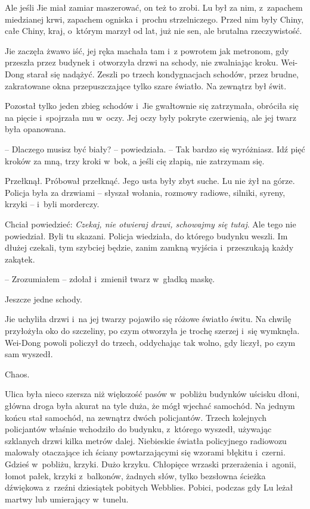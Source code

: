 \documentclass[oneside,polish,11pt,rmheadings]{mwbk}
\begin{document}
Ale jeśli Jie miał zamiar maszerować, on też to zrobi. Lu był za nim, z~zapachem miedzianej krwi, zapachem ogniska i~prochu strzelniczego. Przed nim były Chiny, całe Chiny, kraj, o~którym marzył od lat, już nie sen, ale brutalna rzeczywistość.

Jie zaczęła żwawo iść, jej ręka machała tam i~z powrotem jak metronom, gdy przeszła przez budynek i~otworzyła drzwi na schody, nie zwalniając kroku. Wei-Dong starał się nadążyć. Zeszli po trzech kondygnacjach schodów, przez brudne, zakratowane okna przepuszczające tylko szare światło. Na zewnątrz był świt.

Pozostał tylko jeden zbieg schodów i~Jie gwałtownie się zatrzymała, obróciła się na pięcie i~spojrzała mu w~oczy. Jej oczy były pokryte czerwienią, ale jej twarz była opanowana. 

-- Dlaczego musisz być biały? -- powiedziała. -- Tak bardzo się wyróżniasz. Idź pięć kroków za mną, trzy kroki w~bok, a jeśli cię złapią, nie zatrzymam się.

Przełknął. Próbował przełknąć. Jego usta były zbyt suche. Lu nie żył na górze. Policja była za drzwiami -- słyszał wołania, rozmowy radiowe, silniki, syreny, krzyki -- i~byli morderczy.

Chciał powiedzieć: \textit{Czekaj, nie otwieraj drzwi, schowajmy się tutaj}. Ale tego nie powiedział. Byli tu skazani. Policja wiedziała, do którego budynku weszli. Im dłużej czekali, tym szybciej będzie, zanim zamkną wyjścia i~przeszukają każdy zakątek.

-- Zrozumiałem -- zdołał i~zmienił twarz w~gładką maskę.

Jeszcze jedne schody.

Jie uchyliła drzwi i~na jej twarzy pojawiło się różowe światło świtu. Na chwilę przyłożyła oko do szczeliny, po czym otworzyła je trochę szerzej i~się wymknęła. Wei-Dong powoli policzył do trzech, oddychając tak wolno, gdy liczył, po czym sam wyszedł.

Chaos. 

Ulica była nieco szersza niż większość pasów w~pobliżu budynków uścisku dłoni, główna droga była akurat na tyle duża, że mógł wjechać samochód. Na jednym końcu stał samochód, na zewnątrz dwóch policjantów. Trzech kolejnych policjantów właśnie wchodziło do budynku, z~którego wyszedł, używając szklanych drzwi kilka metrów dalej. Niebieskie światła policyjnego radiowozu malowały otaczające ich ściany powtarzającymi się wzorami błękitu i~czerni. Gdzieś w~pobliżu, krzyki. Dużo krzyku. Chłopięce wrzaski przerażenia i~agonii, łomot pałek, krzyki z~balkonów, żadnych słów, tylko bezsłowna ścieżka dźwiękowa z~rzeźni dziesiątek pobitych Webblies. Pobici, podczas gdy Lu leżał martwy lub umierający w~tunelu.
\end{document}
